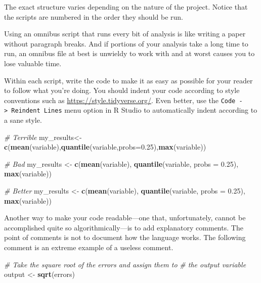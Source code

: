 \documentclass[
  12pt,
  oneside,openany]{book}
\newenvironment{Shaded}{\begin{snugshade}}{\end{snugshade}}
\newcommand{\CommentTok}[1]{\textcolor[rgb]{0.56,0.35,0.01}{\textit{#1}}}
\newcommand{\DataTypeTok}[1]{\textcolor[rgb]{0.13,0.29,0.53}{#1}}
\newcommand{\FloatTok}[1]{\textcolor[rgb]{0.00,0.00,0.81}{#1}}
\newcommand{\KeywordTok}[1]{\textcolor[rgb]{0.13,0.29,0.53}{\textbf{#1}}}
\newcommand{\NormalTok}[1]{#1}
\newcommand{\StringTok}[1]{\textcolor[rgb]{0.31,0.60,0.02}{#1}}
\begin{document}
The exact structure varies depending on the nature of the project. Notice that the scripts are numbered in the order they should be run.

Using an omnibus script that runs every bit of analysis is like writing a paper without paragraph breaks. And if portions of your analysis take a long time to run, an omnibus file at best is unwieldy to work with and at worst causes you to lose valuable time.

Within each script, write the code to make it as easy as possible for your reader to follow what you're doing. You should indent your code according to style conventions such as \url{https://style.tidyverse.org/}. Even better, use the \texttt{Code\ -\textgreater{}\ Reindent\ Lines} menu option in R Studio to automatically indent according to a sane style.

\begin{Shaded}
\begin{Highlighting}[]
\CommentTok{\# Terrible}
\NormalTok{my\_results<{-}}\KeywordTok{c}\NormalTok{(}\KeywordTok{mean}\NormalTok{(variable),}\KeywordTok{quantile}\NormalTok{(variable,}\DataTypeTok{probs=}\FloatTok{0.25}\NormalTok{),}\KeywordTok{max}\NormalTok{(variable))}

\CommentTok{\# Bad}
\NormalTok{my\_results <{-}}\StringTok{ }\KeywordTok{c}\NormalTok{(}\KeywordTok{mean}\NormalTok{(variable),}
\KeywordTok{quantile}\NormalTok{(variable,}
\DataTypeTok{probs =} \FloatTok{0.25}\NormalTok{),}
\KeywordTok{max}\NormalTok{(variable))}

\CommentTok{\# Better}
\NormalTok{my\_results <{-}}\StringTok{ }\KeywordTok{c}\NormalTok{(}\KeywordTok{mean}\NormalTok{(variable),}
                \KeywordTok{quantile}\NormalTok{(variable,}
                         \DataTypeTok{probs =} \FloatTok{0.25}\NormalTok{),}
                \KeywordTok{max}\NormalTok{(variable))}
\end{Highlighting}
\end{Shaded}

Another way to make your code readable---one that, unfortunately, cannot be accomplished quite so algorithmically---is to add explanatory comments. The point of comments is not to document how the language works. The following comment is an extreme example of a useless comment.

\begin{Shaded}
\begin{Highlighting}[]
\CommentTok{\# Take the square root of the errors and assign them to}
\CommentTok{\# the output variable}
\NormalTok{output <{-}}\StringTok{ }\KeywordTok{sqrt}\NormalTok{(errors)}
\end{Highlighting}
\end{Shaded}
\end{document}
